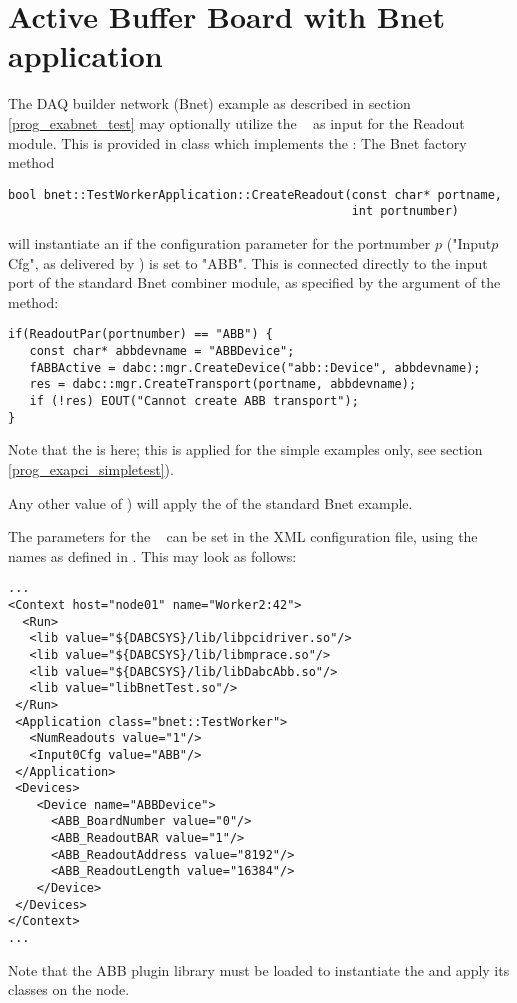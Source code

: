 \section{Active Buffer Board with Bnet application}
\label{prog_exapci_bnet}
The DAQ builder network (Bnet) example as described in section
\ref{prog_exabnet_test} may optionally utilize the \ABB~
as input for the Readout module. This is provided in
class   which implements
the : 
The Bnet factory method 
\begin{small}
\begin{verbatim}
bool bnet::TestWorkerApplication::CreateReadout(const char* portname, 
                                                int portnumber)
\end{verbatim}
\end{small}
will instantiate an 
if the configuration parameter for the portnumber $p$ 
("Input$p$Cfg", as delivered by ) is set to "ABB".
This  is connected  
directly to the input port of the standard Bnet combiner module, as specified by
the  argument of the method:

\begin{small}
\begin{verbatim}
if(ReadoutPar(portnumber) == "ABB") {
   const char* abbdevname = "ABBDevice";
   fABBActive = dabc::mgr.CreateDevice("abb::Device", abbdevname);
   res = dabc::mgr.CreateTransport(portname, abbdevname);
   if (!res) EOUT("Cannot create ABB transport");
} 
\end{verbatim}
\end{small}

Note that the  is  here; 
this is applied for the simple examples only, 
see section \ref{prog_exapci_simpletest}). 

Any other value of ) will
apply the  of the standard Bnet example. 

The parameters for the \ABB~
can be set in the XML configuration file, using the names as defined
in . This may look as follows:

\begin{small}
\begin{verbatim}
...
<Context host="node01" name="Worker2:42">
  <Run>
   <lib value="${DABCSYS}/lib/libpcidriver.so"/>          
   <lib value="${DABCSYS}/lib/libmprace.so"/>
   <lib value="${DABCSYS}/lib/libDabcAbb.so"/>          
   <lib value="libBnetTest.so"/>
 </Run> 
 <Application class="bnet::TestWorker">
   <NumReadouts value="1"/>
   <Input0Cfg value="ABB"/>
 </Application>
 <Devices>        
    <Device name="ABBDevice">
      <ABB_BoardNumber value="0"/>
      <ABB_ReadoutBAR value="1"/> 
      <ABB_ReadoutAddress value="8192"/>
      <ABB_ReadoutLength value="16384"/> 
    </Device>
 </Devices>      
</Context>
...
\end{verbatim}
\end{small}

Note that the ABB plugin library  must be loaded
to instantiate the  and apply its classes on the node.


